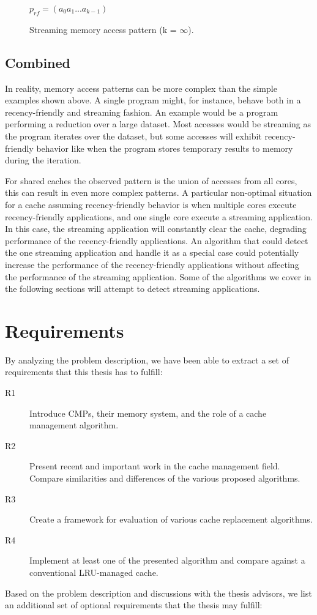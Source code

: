 \begin{figure}[ht]
\centering
$p_{rf} = (a_0 a_1 ... a_{k-1})$
\label{fig:algorithms:st_pattern}
\caption{Streaming memory access  pattern (k = $\infty$).}
\end{figure}

\subsection{Combined}
In reality, memory access patterns can be more complex than the simple examples shown above.
A single program might, for instance, behave both in a recency-friendly and streaming fashion. 
An example would be a program performing a reduction over a large dataset.
Most accesses would be streaming as the program iterates over the dataset, but some accesses will exhibit recency-friendly behavior like when the program stores temporary results to memory during the iteration.

For shared caches the observed pattern is the union of accesses from all cores, this can result in even more complex patterns.
A particular non-optimal situation for a cache assuming recency-friendly behavior is when multiple cores execute recency-friendly applications, and one single core execute a streaming application.
In this case, the streaming application will constantly clear the cache, degrading performance of the recency-friendly applications.
An algorithm that could detect the one streaming application and handle it as a special case could potentially increase the performance of the recency-friendly applications without affecting the performance of the streaming application.
Some of the algorithms we cover in the following sections will attempt to detect streaming applications.

\section{Requirements}
By analyzing the problem description, we have been able to extract a set of requirements that this thesis has to fulfill:

\begin{description}
    \item[R1] Introduce CMPs, their memory system, and the role of a cache management algorithm.
    \item[R2] Present recent and important work in the cache management field. Compare similarities and differences of the various proposed algorithms.
    \item[R3] Create a framework for evaluation of various cache replacement algorithms.
    \item[R4] Implement at least one of the presented algorithm and compare against a conventional LRU-managed cache.
\end{description}
Based on the problem description and discussions with the thesis advisors, we list an additional set of optional requirements that the thesis may fulfill:

